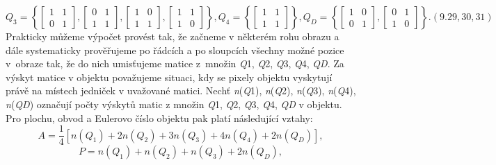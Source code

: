 \[Q_{3} =\left\{\left[\begin{array}{cc} {1} & {1} \\ {0} & {1} \end{array}\right],\left[\begin{array}{cc} {0} & {1} \\ {1} & {1} \end{array}\right],\left[\begin{array}{cc} {1} & {0} \\ {1} & {1} \end{array}\right],\left[\begin{array}{cc} {1} & {1} \\ {1} & {0} \end{array}\right]\right\},   Q_{4} =\left\{\left[\begin{array}{cc} {1} & {1} \\ {1} & {1} \end{array}\right]\right\},   Q_{D} =\left\{\left[\begin{array}{cc} {1} & {0} \\ {0} & {1} \end{array}\right],\left[\begin{array}{cc} {0} & {1} \\ {1} & {0} \end{array}\right]\right\}. (9.29, 30, 31)\] 
Prakticky můžeme výpočet provést tak, že začneme v některém rohu obrazu a dále systematicky prověřujeme po řádcích a po sloupcích všechny možné pozice v~obraze tak, že do nich umisťujeme matice z~množin \textit{Q}1, \textit{Q}2, \textit{Q}3, \textit{Q}4, \textit{QD}. Za výskyt matice v objektu považujeme situaci, kdy se pixely objektu vyskytují právě na místech jedniček v uvažované matici. Nechť \textit{n}(\textit{Q}1), \textit{n}(\textit{Q}2), \textit{n}(\textit{Q}3), \textit{n}(\textit{Q}4), \textit{n}(\textit{QD}) označují počty výskytů matic z množin \textit{Q}1, \textit{Q}2, \textit{Q}3, \textit{Q}4, \textit{QD} v objektu. Pro plochu, obvod a Eulerovo číslo objektu pak platí následující vztahy:
\begin{equation} \label{GrindEQ__9_32_} 
A=\frac{1}{4} \left[n\left(Q_{1} \right)+2n\left(Q_{2} \right)+3n\left(Q_{3} \right)+4n\left(Q_{4} \right)+2n\left(Q_{D} \right)\right],  
\end{equation} 
\begin{equation} \label{GrindEQ__9_33_} 
P=n\left(Q_{1} \right)+n\left(Q_{2} \right)+n\left(Q_{3} \right)+2n\left(Q_{D} \right),  
\end{equation} 

